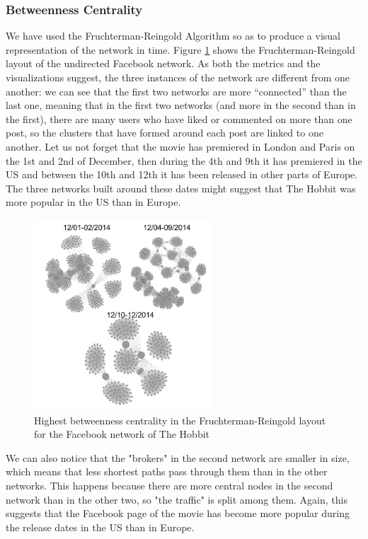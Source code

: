 \documentclass{llncs}
\begin{document}
\subsubsection{Betweenness Centrality}
We have used the Fruchterman-Reingold Algorithm so as to produce a visual
representation of the network in time. Figure
\ref{fig:hobbit-facebook-betweennes-centrality} shows the Fruchterman-Reingold
layout of the undirected Facebook network. As both the metrics and the
visualizations suggest, the three instances of the network are different from
one another: we can see that the first two networks are more “connected” than
the last one, meaning that in the first two networks (and more in the second
than in the first), there are many users who have liked or commented on more
than one post, so the clusters that have formed around each post are linked to
one another. Let us not forget that the movie has premiered in London and Paris
on the 1st and 2nd of December, then during the 4th and 9th it has premiered in
the US and between the 10th and 12th it has been released in other parts of
Europe. The three networks built around these dates might suggest that The
Hobbit was more popular in the US than in Europe.
%
\begin{figure}
\centering
\includegraphics[width=0.6\textwidth]{hobbit-facebook-betweennes-centrality.png}
\caption{Highest betweenness centrality in the Fruchterman-Reingold layout for
the Facebook network of The Hobbit
\label{fig:hobbit-facebook-betweennes-centrality}}
\end{figure}
%
We can also notice that the "brokers" in the second network are smaller in size,
which means that less shortest paths pass through them than in the other
networks. This happens because there are more central nodes in the second
network than in the other two, so "the traffic" is split among them. Again, this
suggests that the Facebook page of the movie has become more popular during the
release dates in the US than in Europe.
%
\end{document}
